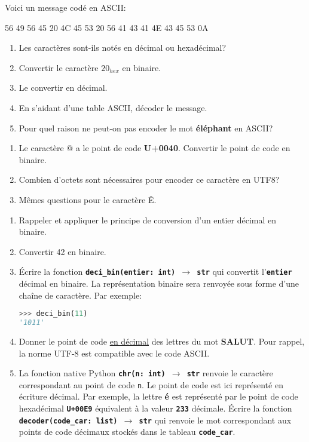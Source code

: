 \documentclass[a4paper,11pt]{article}
\begin{document}
\begin{exo}
    Voici un message codé en ASCII:
    \begin{center}
        56 49 56 45 20 4C 45 53 20 56 41 43 41 4E 43 45 53 0A
    \end{center}
    \begin{enumerate}
        \item Les caractères sont-ils notés en décimal ou hexadécimal?
        \item Convertir le caractère $20_{hex}$ en binaire.
        \item Le convertir en décimal.
        \item En s'aidant d'une table ASCII, décoder le message.
        \item Pour quel raison ne peut-on pas encoder le mot \textbf{éléphant} en ASCII?
    \end{enumerate}
\end{exo}
\begin{exo}
    \begin{enumerate}
        \item Le caractère @ a le point de code \textbf{U+0040}. Convertir le point de code en binaire.
        \item Combien d'octets sont nécessaires pour encoder ce caractère en UTF8?
        \item Mêmes questions pour le caractère Ê.
    \end{enumerate}
\end{exo}
\begin{exo}
\begin{enumerate}
    \item Rappeler et appliquer le principe de conversion d'un entier décimal en binaire.
    \item Convertir 42 en binaire.
    \item Écrire la fonction \textbf{\texttt{deci\_bin(entier: int) $\rightarrow$ str}} qui convertit l'\textbf{\texttt{entier}} décimal en binaire. La représentation binaire sera renvoyée sous forme d'une chaîne de caractère. Par exemple:
    \begin{lstlisting}[language=Python  , xleftmargin=2em, xrightmargin=2em]
>>> deci_bin(11)
'1011'
\end{lstlisting}
    \item Donner le point de code \underline{en décimal} des lettres du mot \textbf{SALUT}. Pour rappel, la norme UTF-8 est compatible avec le code ASCII.
    \item La fonction native Python \textbf{\texttt{chr(n: int) $\rightarrow$ str}} renvoie le caractère correspondant au point de code \textnormal{\texttt{n}}. Le point de code est ici représenté en écriture décimal. Par exemple, la lettre \textbf{é} est représenté par le point de code hexadécimal \textbf{\texttt{U+00E9}} équivalent à la valeur \textbf{\texttt{233}} décimale. Écrire la fonction \textbf{\texttt{decoder(code\_car: list) $\rightarrow$ str}} qui renvoie le mot correspondant aux points de code décimaux stockés dans le tableau \textbf{\texttt{code\_car}}.
\end{enumerate}
\end{exo}
\end{document}
